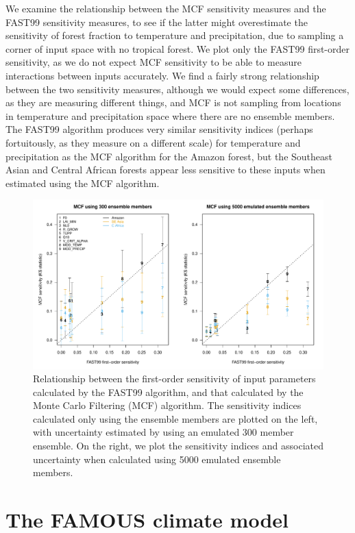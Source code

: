 \documentclass[gmd, manuscript]{copernicus} %
\begin{document}
We examine the relationship between the MCF sensitivity measures and the FAST99 sensitivity measures, to see if the latter might overestimate the sensitivity of forest fraction to temperature and precipitation, due to sampling a corner of input space with no tropical forest. We plot only the FAST99 first-order sensitivity, as we do not expect MCF sensitivity to be able to measure interactions between inputs accurately. We find a fairly strong relationship between the two sensitivity measures, although we would expect some differences, as they are measuring different things, and MCF is not sampling from locations in temperature and precipitation space where there are no ensemble members. The FAST99 algorithm produces very similar sensitivity indices (perhaps fortuitously, as they measure on a different scale) for temperature and precipitation as the MCF algorithm for the Amazon forest, but the Southeast Asian and Central African forests appear less sensitive to these inputs when estimated using the MCF algorithm.

\begin{figure}[t]
\includegraphics[width=12cm]{../graphics/fast99_vs_mcf2.pdf}
\caption{Relationship between the first-order sensitivity of input parameters calculated by the FAST99 algorithm, and that calculated by the Monte Carlo Filtering (MCF) algorithm. The sensitivity indices calculated only using the ensemble members are plotted on the left, with uncertainty estimated by using an emulated 300 member ensemble. On the right, we plot the sensitivity indices and associated uncertainty when calculated using 5000 emulated ensemble members.}
\label{fig:fast99_vs_mcf2}
\end{figure}

\section{The FAMOUS climate model}\label{ssec:famous_model}
\end{document}
